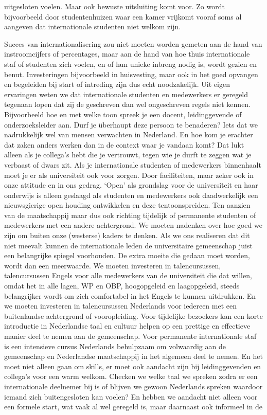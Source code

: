 \documentclass[smallauthor, chapterhaspagenum, nochapterinheader, pagenuminheader,  bigchapnum,medium2, tocpages,  garamond, titleinheader]{jote-book}
\begin{document}
uitgesloten voelen. Maar ook bewuste uitsluiting komt voor. Zo wordt bijvoorbeeld door studentenhuizen waar een kamer vrijkomt vooraf soms al aangeven dat internationale studenten niet welkom zijn.



	Succes van internationalisering zou niet moeten worden gemeten aan de hand van instroomcijfers of percentages, maar aan de hand van hoe thuis internationale staf of studenten zich voelen, en of hun unieke inbreng nodig is, wordt gezien en benut. Investeringen bijvoorbeeld in huisvesting, maar ook in het goed opvangen en begeleiden bij start of intreding zijn dus echt noodzakelijk. Uit eigen ervaringen weten we dat internationale studenten en medewerkers er geregeld tegenaan lopen dat zij de geschreven dan wel ongeschreven regels niet kennen. Bijvoorbeeld hoe en met welke toon spreek je een docent, leidinggevende of onderzoeksleider aan. Durf je überhaupt deze persoon te benaderen? Iets dat we nadrukkelijk wel van mensen verwachten in Nederland. En hoe kom je erachter dat zaken anders werken dan in de context waar je vandaan komt? Dat lukt alleen als je collega's hebt die je vertrouwt, tegen wie je durft te zeggen wat je verbaast of dwars zit. Als je internationale studenten of medewerkers binnenhaalt moet je er als universiteit ook voor zorgen. Door faciliteiten, maar zeker ook in onze attitude en in ons gedrag. ‘Open' als grondslag voor de universiteit en haar onderwijs is alleen geslaagd als studenten en medewerkers ook daadwerkelijk een nieuwsgierige open houding ontwikkelen en deze tentoonspreiden. Ten aanzien van de maatschappij maar dus ook richting tijdelijk of permanente studenten of medewerkers met een andere achtergrond. We moeten nadenken over hoe goed we zijn om buiten onze (westerse) kaders te denken. Als we ons realiseren dat dit niet meevalt kunnen de internationale leden de universitaire gemeenschap juist een belangrijke spiegel voorhouden. De extra moeite die gedaan moet worden, wordt dan een meerwaarde. We moeten investeren in talencursussen, talencursussen Engels voor alle medewerkers van de universiteit die dat willen, omdat het in alle lagen, WP en OBP, hoogopgeleid en laagopgeleid, steeds belangrijker wordt om zich comfortabel in het Engels te kunnen uitdrukken. En we moeten investeren in talencursussen Nederlands voor iedereen met een buitenlandse achtergrond of vooropleiding. Voor tijdelijke bezoekers kan een korte introductie in Nederlandse taal en cultuur helpen op een prettige en effectieve manier deel te nemen aan de gemeenschap. Voor permanente internationale staf is een intensieve cursus Nederlands behulpzaam om volwaardig aan de gemeenschap en Nederlandse maatschappij in het algemeen deel te nemen. En het moet niet alleen gaan om skills, er moet ook aandacht zijn bij leidinggevenden en collega's voor een warm welkom. Checken we welke taal we spreken zodra er een internationale deelnemer bij is of blijven we gewoon Nederlands spreken waardoor iemand zich buitengesloten kan voelen? En hebben we aandacht niet alleen voor een formele start, wat vaak al wel geregeld is, maar daarnaast ook informeel in de 
\end{document}
